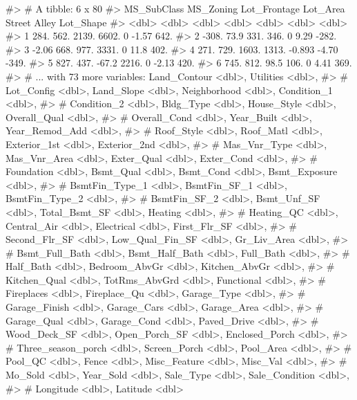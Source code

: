 \begin{Schunk}
\end{Schunk}

\begin{Schunk}
\begin{Soutput}
#> # A tibble: 6 x 80
#>   MS_SubClass MS_Zoning Lot_Frontage Lot_Area Street Alley Lot_Shape
#>         <dbl>     <dbl>        <dbl>    <dbl>  <dbl> <dbl>     <dbl>
#> 1      284.       562.        2139.     6602.  0     -1.57      642.
#> 2     -308.        73.9        331.      346.  0      9.29     -282.
#> 3       -2.06     668.         977.     3331.  0     11.8       402.
#> 4      271.       729.        1603.     1313. -0.893 -4.70     -349.
#> 5      827.       437.         -67.2    2216.  0     -2.13      420.
#> 6      745.       812.          98.5     106.  0      4.41      369.
#> # ... with 73 more variables: Land_Contour <dbl>, Utilities <dbl>,
#> #   Lot_Config <dbl>, Land_Slope <dbl>, Neighborhood <dbl>, Condition_1 <dbl>,
#> #   Condition_2 <dbl>, Bldg_Type <dbl>, House_Style <dbl>, Overall_Qual <dbl>,
#> #   Overall_Cond <dbl>, Year_Built <dbl>, Year_Remod_Add <dbl>,
#> #   Roof_Style <dbl>, Roof_Matl <dbl>, Exterior_1st <dbl>, Exterior_2nd <dbl>,
#> #   Mas_Vnr_Type <dbl>, Mas_Vnr_Area <dbl>, Exter_Qual <dbl>, Exter_Cond <dbl>,
#> #   Foundation <dbl>, Bsmt_Qual <dbl>, Bsmt_Cond <dbl>, Bsmt_Exposure <dbl>,
#> #   BsmtFin_Type_1 <dbl>, BsmtFin_SF_1 <dbl>, BsmtFin_Type_2 <dbl>,
#> #   BsmtFin_SF_2 <dbl>, Bsmt_Unf_SF <dbl>, Total_Bsmt_SF <dbl>, Heating <dbl>,
#> #   Heating_QC <dbl>, Central_Air <dbl>, Electrical <dbl>, First_Flr_SF <dbl>,
#> #   Second_Flr_SF <dbl>, Low_Qual_Fin_SF <dbl>, Gr_Liv_Area <dbl>,
#> #   Bsmt_Full_Bath <dbl>, Bsmt_Half_Bath <dbl>, Full_Bath <dbl>,
#> #   Half_Bath <dbl>, Bedroom_AbvGr <dbl>, Kitchen_AbvGr <dbl>,
#> #   Kitchen_Qual <dbl>, TotRms_AbvGrd <dbl>, Functional <dbl>,
#> #   Fireplaces <dbl>, Fireplace_Qu <dbl>, Garage_Type <dbl>,
#> #   Garage_Finish <dbl>, Garage_Cars <dbl>, Garage_Area <dbl>,
#> #   Garage_Qual <dbl>, Garage_Cond <dbl>, Paved_Drive <dbl>,
#> #   Wood_Deck_SF <dbl>, Open_Porch_SF <dbl>, Enclosed_Porch <dbl>,
#> #   Three_season_porch <dbl>, Screen_Porch <dbl>, Pool_Area <dbl>,
#> #   Pool_QC <dbl>, Fence <dbl>, Misc_Feature <dbl>, Misc_Val <dbl>,
#> #   Mo_Sold <dbl>, Year_Sold <dbl>, Sale_Type <dbl>, Sale_Condition <dbl>,
#> #   Longitude <dbl>, Latitude <dbl>
\end{Soutput}
\end{Schunk}

